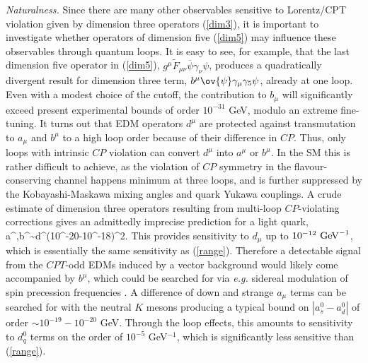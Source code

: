 \documentclass[prl,twocolumn,tightenlines,preprintnumbers,floatfix,nofootinbib]{revtex4}
\begin{document}

{\it Naturalness.}
Since there are many other observables sensitive to Lorentz/CPT violation given by dimension 
three operators (\ref{dim3}), 
it is important to investigate whether operators of dimension five (\ref{dim5}) may 
influence these observables through quantum loops. It is easy to see, for example, 
that the last dimension five operator in (\ref{dim5}), $g^\mu \widetilde{F}_{\mu\nu} \overline{\psi}
\gamma_\nu\psi$, produces a quadratically divergent 
result for dimension three term, $b^\mu \ov{\psi} \gamma_\mu\gamma_5 \psi$, already at one loop. 
Even with a modest choice of 
the cutoff, the contribution to $b_\mu$ will 
significantly exceed present experimental bounds of order $10^{-31}$ GeV, modulo an extreme fine-tuning. 
It turns out that EDM operators $d^\mu$ are protected 
against transmutation to $a_\mu$ and $b^\mu$ to a high loop order because of their
difference in $CP$. Thus, only loops with intrinsic 
$CP$ violation can convert $d^\mu$ into $a^\mu$ or $b^\mu$. In the SM this is rather difficult 
to achieve, as the violation of $CP$ symmetry in the flavour-conserving channel 
happens minimum at three loops,
 and is further suppressed by the Kobayashi-Maskawa mixing angles and 
quark Yukawa couplings.
A crude estimate of dimension three operators resulting from multi-loop $CP$-violating
corrections gives an admittedly imprecise prediction for a light quark,
\be
a^\mu,b^\mu \sim d^\mu (10^{-20}-10^{-18})^2.
\label{bdi}
\ee
This provides sensitivity to $d_\mu$ up to $10^{-12}~{\rm GeV}^{-1}$,
which is essentially the same sensitivity as (\ref{range}). Therefore a detectable signal 
from the $CPT$-odd EDMs induced by a vector background would likely come accompanied 
by $b^\mu$, which could be searched for via {\em e.g.}
sidereal modulation of spin precession frequencies \cite{Kost}. 
A difference of down and strange $a_\mu$ terms 
can be searched for with the neutral $K$ mesons producing
a typical bound on $|a^0_s-a^0_d|$ of order $\sim 10^{-19}-10^{-20}$ GeV. 
Through the loop effects, this amounts to sensitivity to $d^0_q$ terms 
on the order of $10^{-5}$ GeV$^{-1}$, 
which is significantly less sensitive than (\ref{range}). 
\end{document}
